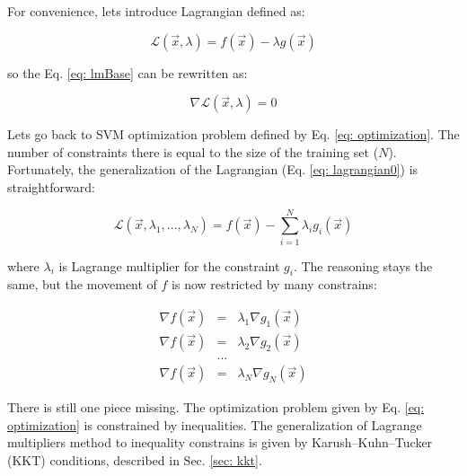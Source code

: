 For convenience, lets introduce Lagrangian defined as:

\begin{equation}
 \mathcal{L} (\vec x, \lambda) = f (\vec x) - \lambda g (\vec x)
 \label{eq: lagrangian0}
\end{equation}

so the Eq. \ref{eq: lmBase} can be rewritten as:

\begin{equation}
 \nabla \mathcal{L} (\vec x, \lambda) = 0
 \label{eq: lagrEq}
\end{equation}

Lets go back to SVM optimization problem defined by Eq. \ref{eq: optimization}. The number of constraints there is equal to the size of the training set ($N$). Fortunately, the generalization of the Lagrangian (Eq. \ref{eq: lagrangian0}) is straightforward:

\begin{equation}
 \mathcal{L} (\vec x, \lambda_1, ..., \lambda_N) = f (\vec x) - \sum_{i = 1}^N\lambda_i g_i (\vec x)
 \label{eq: lagrangian}
\end{equation}

where $\lambda_i$ is Lagrange multiplier for the constraint $g_i$. The reasoning stays the same, but the movement of $f$ is now restricted by many constrains:

\begin{eqnarray*}
 \nabla f (\vec x) & = &  \lambda_1 \nabla g_1 (\vec x) \\
 \nabla f (\vec x) & = &  \lambda_2 \nabla g_2 (\vec x) \\
			 & ... & \\
 \nabla f (\vec x) & = &  \lambda_N \nabla g_N (\vec x)
\end{eqnarray*}

There is still one piece missing. The optimization problem given by Eq. \ref{eq: optimization} is constrained by inequalities. The generalization of Lagrange multipliers method to inequality constrains is given by Karush–Kuhn–Tucker (KKT) conditions, described in Sec. \ref{sec: kkt}.

